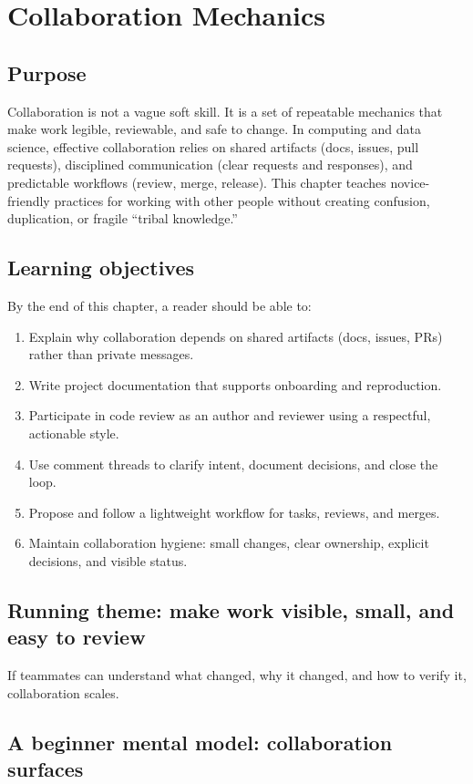 \chapter{Collaboration Mechanics}
\label{ch:collaboration}

\section*{Purpose}
Collaboration is not a vague soft skill. It is a set of repeatable mechanics that make work legible, reviewable, and safe to change. In computing and data science, effective collaboration relies on shared artifacts (docs, issues, pull requests), disciplined communication (clear requests and responses), and predictable workflows (review, merge, release). This chapter teaches novice-friendly practices for working with other people without creating confusion, duplication, or fragile ``tribal knowledge.''

\section*{Learning objectives}
By the end of this chapter, a reader should be able to:
\begin{enumerate}
\item Explain why collaboration depends on shared artifacts (docs, issues, PRs) rather than private messages.
\item Write project documentation that supports onboarding and reproduction.
\item Participate in code review as an author and reviewer using a respectful, actionable style.
\item Use comment threads to clarify intent, document decisions, and close the loop.
\item Propose and follow a lightweight workflow for tasks, reviews, and merges.
\item Maintain collaboration hygiene: small changes, clear ownership, explicit decisions, and visible status.
\end{enumerate}

\section*{Running theme: make work visible, small, and easy to review}
If teammates can understand what changed, why it changed, and how to verify it, collaboration scales.

\section{A beginner mental model: collaboration surfaces}
